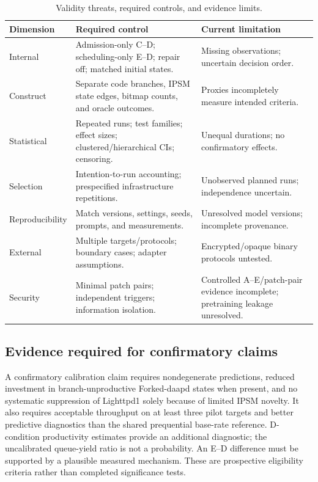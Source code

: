 \documentclass[final,5p,times,number]{elsarticle}
\begin{document}
\begin{table}[!tbp]
\centering\small
\caption{Validity threats, required controls, and evidence limits.}
\label{tab:threats}
\begin{tabularx}{\textwidth}{l Y Y}
\toprule
Dimension & Required control & Current limitation \\
\midrule
Internal & Admission-only C--D; scheduling-only E--D; repair off; matched initial states. & Missing observations; uncertain decision order. \\
Construct & Separate code branches, IPSM state edges, bitmap counts, and oracle outcomes. & Proxies incompletely measure intended criteria. \\
Statistical & Repeated runs; test families; effect sizes; clustered/hierarchical CIs; censoring. & Unequal durations; no confirmatory effects. \\
Selection & Intention-to-run accounting; prespecified infrastructure repetitions. & Unobserved planned runs; independence uncertain. \\
Reproducibility & Match versions, settings, seeds, prompts, and measurements. & Unresolved model versions; incomplete provenance. \\
External & Multiple targets/protocols; boundary cases; adapter assumptions. & Encrypted/opaque binary protocols untested. \\
Security & Minimal patch pairs; independent triggers; information isolation. & Controlled A--E/patch-pair evidence incomplete; pretraining leakage unresolved. \\
\bottomrule
\end{tabularx}
\end{table}

\subsection{Evidence required for confirmatory claims}
A confirmatory calibration claim requires nondegenerate predictions, reduced investment in branch-unproductive Forked-daapd states when present, and no systematic suppression of Lighttpd1 solely because of limited IPSM novelty. It also requires acceptable throughput on at least three pilot targets and better predictive diagnostics than the shared prequential base-rate reference. D-condition productivity estimates provide an additional diagnostic; the uncalibrated queue-yield ratio is not a probability. An E--D difference must be supported by a plausible measured mechanism. These are prospective eligibility criteria rather than completed significance tests.
\end{document}

